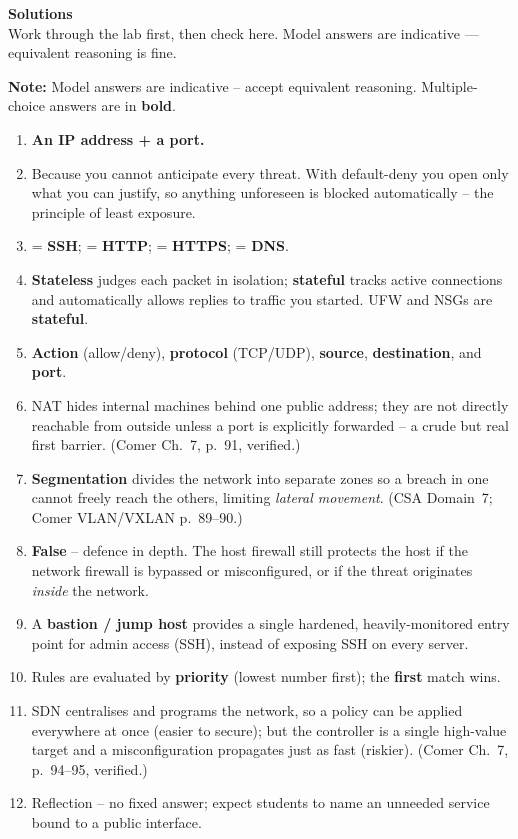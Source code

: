 \documentclass[11pt]{article}
\begin{document}
\signoff

\clearpage
\solheader
{\LARGE\bfseries\color{kred} Solutions}\\[2pt]
{\small Work through the lab first, then check here. Model answers are indicative — equivalent reasoning is fine.}\par\vspace{8pt}
\noindent\textbf{Note:} Model answers are indicative -- accept equivalent reasoning. Multiple-choice
answers are in \textbf{bold}.

\begin{enumerate}
\item \textbf{An IP address + a port.}
\item Because you cannot anticipate every threat. With default-deny you open only what you can
      justify, so anything unforeseen is blocked automatically -- the principle of least exposure.
\item {} = \textbf{SSH};  = \textbf{HTTP};  = \textbf{HTTPS};  =
      \textbf{DNS}.
\item \textbf{Stateless} judges each packet in isolation; \textbf{stateful} tracks active connections
      and automatically allows replies to traffic you started. UFW and NSGs are \textbf{stateful}.
\item \textbf{Action} (allow/deny), \textbf{protocol} (TCP/UDP), \textbf{source}, \textbf{destination},
      and \textbf{port}.
\item NAT hides internal machines behind one public address; they are not directly reachable from
      outside unless a port is explicitly forwarded -- a crude but real first barrier. (Comer Ch.~7,
      p.~91, verified.)
\item \textbf{Segmentation} divides the network into separate zones so a breach in one cannot freely
      reach the others, limiting \emph{lateral movement}. (CSA Domain~7; Comer VLAN/VXLAN p.~89--90.)
\item \textbf{False} -- defence in depth. The host firewall still protects the host if the network
      firewall is bypassed or misconfigured, or if the threat originates \emph{inside} the network.
\item A \textbf{bastion / jump host} provides a single hardened, heavily-monitored entry point for
      admin access (SSH), instead of exposing SSH on every server.
\item Rules are evaluated by \textbf{priority} (lowest number first); the \textbf{first} match wins.
\item SDN centralises and programs the network, so a policy can be applied everywhere at once (easier
      to secure); but the controller is a single high-value target and a misconfiguration propagates
      just as fast (riskier). (Comer Ch.~7, p.~94--95, verified.)
\item Reflection -- no fixed answer; expect students to name an unneeded service bound to a public
      interface.
\end{enumerate}
\end{document}

